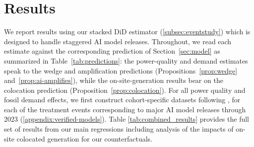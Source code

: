 \documentclass[a4paper,fleqn,longmktitle]{cas-sc}
\theoremstyle{plain}
\theoremstyle{definition}
\begin{document}



\section{Results}\label{Sec::Results}

We report results using our stacked DiD estimator (\autoref{subsec:eventstudy}) which is designed to handle staggered AI model releases. Throughout, we read each estimate against the corresponding prediction of Section~\ref{sec:model} as summarized in Table~\ref{tab:predictions}: the power-quality and demand estimates speak to the wedge and amplification predictions (Propositions~\ref{prop:wedge} and~\ref{prop:ai-amplifies}), while the on-site-generation results bear on the colocation prediction (Proposition~\ref{prop:colocation}). For all power quality and fossil demand effects, we first construct cohort-specific datasets following \citet{callaway2021difference}, for each of the treatment events corresponding to major AI model releases through 2023 (\autoref{appendix:verified-models}).
Table \ref{tab:combined_results} provides the full set of results from our main regressions including analysis of the impacts of on-site colocated generation for our counterfactuals.
\end{document}

